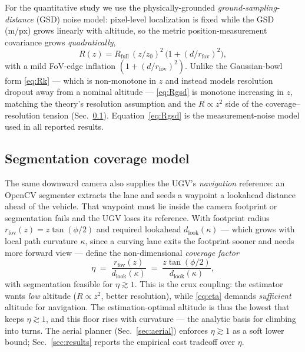 \documentclass[letterpaper, 10 pt, conference]{ieeeconf}  %
\begin{document}
For the quantitative study we use the physically-grounded \emph{ground-sampling-distance}
(GSD) noise model: pixel-level localization is fixed while the GSD (m/px) grows linearly with
altitude, so the metric position-measurement covariance grows \emph{quadratically},
\begin{equation}
R(z) = R_{\mathrm{full}}\,(z/z_0)^2\,\big(1+(d/r_{\mathrm{fov}})^2\big),
\label{eq:Rgsd}
\end{equation}
with a mild FoV-edge inflation $(1+(d/r_{\mathrm{fov}})^2)$. Unlike the Gaussian-bowl form
\eqref{eq:Rk} --- which is non-monotone in $z$ and instead models resolution dropout away from a
nominal altitude --- \eqref{eq:Rgsd} is monotone increasing in $z$, matching the theory's
resolution assumption and the $R\propto z^2$ side of the coverage--resolution tension
(Sec.~\ref{sec:coverage}). Equation~\eqref{eq:Rgsd} is the measurement-noise model used in all
reported results.

\subsection{Segmentation coverage model}
\label{sec:coverage}
The same downward camera also supplies the UGV's \emph{navigation} reference: an OpenCV
segmenter extracts the lane and seeds a waypoint a lookahead distance ahead of the vehicle.
That waypoint must lie inside the camera footprint or segmentation fails and the UGV loses its
reference. With footprint radius $r_{\mathrm{fov}}(z)=z\tan(\phi/2)$ and required lookahead
$d_{\mathrm{look}}(\kappa)$ --- which grows with local path curvature $\kappa$, since a curving
lane exits the footprint sooner and needs more forward view --- define the non-dimensional
\emph{coverage factor}
\begin{equation}
\eta \;=\; \frac{r_{\mathrm{fov}}(z)}{d_{\mathrm{look}}(\kappa)}
      \;=\; \frac{z\tan(\phi/2)}{d_{\mathrm{look}}(\kappa)} ,
\label{eq:eta}
\end{equation}
with segmentation feasible for $\eta\gtrsim1$. This is the crux coupling: the estimator wants \emph{low} altitude ($R\propto z^2$, better
resolution), while \eqref{eq:eta} demands \emph{sufficient} altitude for navigation. The
estimation-optimal altitude is thus the lowest that keeps $\eta\gtrsim1$, and this floor rises
with curvature --- the analytic basis for climbing into turns. The aerial planner
(Sec.~\ref{sec:aerial}) enforces $\eta\gtrsim1$ as a soft lower bound; Sec.~\ref{sec:results}
reports the empirical cost tradeoff over $\eta$.
\end{document}

